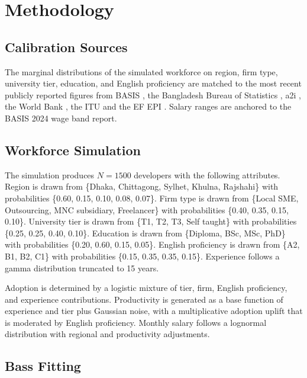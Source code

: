 \documentclass[11pt,a4paper]{report}
\begin{document}
\chapter{Methodology}

\section{Calibration Sources}

The marginal distributions of the simulated workforce on region, firm
type, university tier, education, and English proficiency are matched
to the most recent publicly reported figures from BASIS
\citep{BASIS2024,BASIS2025}, the Bangladesh Bureau of Statistics
\citep{BBS2024LFS}, a2i \citep{a2iDigitalLiteracy2024}, the World Bank
\citep{WorldBank2024DigitalBD}, the ITU \citep{ITUDigitalDevelopment2025}
and the EF EPI \citep{EFEPI2024}. Salary ranges are anchored to the
BASIS 2024 wage band report.

\section{Workforce Simulation}

The simulation produces $N = 1500$ developers with the following
attributes. Region is drawn from \{Dhaka, Chittagong, Sylhet, Khulna,
Rajshahi\} with probabilities \{0.60, 0.15, 0.10, 0.08, 0.07\}. Firm
type is drawn from \{Local SME, Outsourcing, MNC subsidiary, Freelancer\}
with probabilities \{0.40, 0.35, 0.15, 0.10\}. University tier is drawn
from \{T1, T2, T3, Self taught\} with probabilities
\{0.25, 0.25, 0.40, 0.10\}. Education is drawn from \{Diploma, BSc, MSc,
PhD\} with probabilities \{0.20, 0.60, 0.15, 0.05\}. English proficiency
is drawn from \{A2, B1, B2, C1\} with probabilities
\{0.15, 0.35, 0.35, 0.15\}. Experience follows a gamma distribution
truncated to 15 years.

Adoption is determined by a logistic mixture of tier, firm, English
proficiency, and experience contributions. Productivity is generated as
a base function of experience and tier plus Gaussian noise, with a
multiplicative adoption uplift that is moderated by English proficiency.
Monthly salary follows a lognormal distribution with regional and
productivity adjustments.

\section{Bass Fitting}
\end{document}
